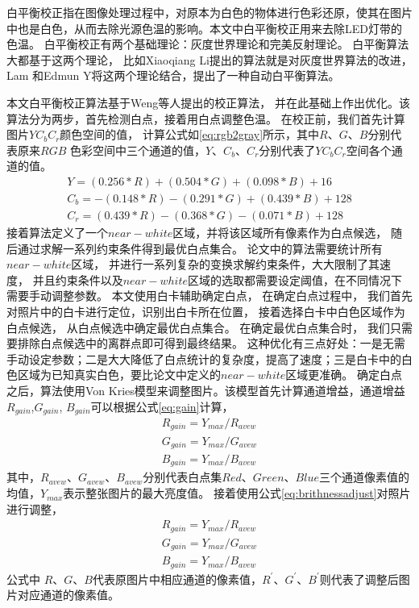 白平衡校正指在图像处理过程中，对原本为白色的物体进行色彩还原，使其在图片中也是白色，从而去除光源色温的影响。本文中白平衡校正用来去除LED灯带的色温。
白平衡校正有两个基础理论：灰度世界理论和完美反射理论。
白平衡算法大都基于这两个理论，
比如Xiaoqiang Li\cite{10.1007/978-3-642-37149-3_38}提出的算法就是对灰度世界算法的改进，
Lam 和Edmun Y\cite{lam2005combining}将这两个理论结合，提出了一种自动白平衡算法。
\par
本文白平衡校正算法基于Weng\cite{weng2005novel}等人提出的校正算法，
并在此基础上作出优化。该算法分为两步，首先检测白点，接着用白点调整色温。
在校正前，我们首先计算图片$YC_b C_r$颜色空间的值，
计算公式如\eqref{eq:rgb2gray}所示，其中$R$、$G$、$B$分别代表原来$RGB$
色彩空间中三个通道的值，$Y$、$C_b$、$C_r$分别代表了$YC_b C_r$空间各个通道的值。
\begin{equation}
\label{eq:rgb2gray}
\begin{split}
Y=(0.256\ast R)+ (0.504\ast G)+(0.098\ast B)+16\\
C_b=-(0.148\ast R)-(0.291\ast G)+(0.439\ast B)+128\\
C_r=(0.439\ast R)-(0.368\ast G)-(0.071\ast B)+128
\end{split}
\end{equation}
接着算法定义了一个$near-white$区域，并将该区域所有像素作为白点候选，
随后通过求解一系列约束条件得到最优白点集合。
论文中的算法需要统计所有$near-white$区域，
并进行一系列复杂的变换求解约束条件，大大限制了其速度，
并且约束条件以及$near-white$区域的选取都需要设定阈值，在不同情况下需要手动调整参数。
本文使用白卡辅助确定白点，
在确定白点过程中，
我们首先对照片中的白卡进行定位，识别出白卡所在位置，
接着选择白卡中白色区域作为白点候选，
从白点候选中确定最优白点集合。
在确定最优白点集合时，
我们只需要排除白点候选中的离群点即可得到最终结果。
这种优化有三点好处：一是无需手动设定参数；二是大大降低了白点统计的复杂度，提高了速度；三是白卡中的白色区域为已知真实白色，要比论文中定义的$near-white$区域更准确。
确定白点之后，算法使用Von Kries模型\cite{macadam1970sources}来调整图片。该模型首先计算通道增益，通道增益$R_{gain}$,$ G_{gain}$, $B_{gain}$可以根据公式\eqref{eq:gain}计算，
\begin{equation}
\label{eq:gain}
\begin{split}
R_{gain}=Y_{max}/R_{avew}\\
G_{gain}=Y_{max}/G_{avew}\\
B_{gain}=Y_{max}/B_{avew}
\end{split}
\end{equation}
其中，$R_{avew}$、$G_{avew}$、$B_{avew}$分别代表白点集$Red$、$Green$、$Blue$三个通道像素值的均值，$Y_{max}$表示整张图片的最大亮度值。
接着使用公式\eqref{eq:brithnessadjust}对照片进行调整，
\begin{equation}
\label{eq:brithnessadjust}
\begin{split}
R_{gain}=Y_{max}/R_{avew}\\
G_{gain}=Y_{max}/G_{avew}\\
B_{gain}=Y_{max}/B_{avew}
\end{split}
\end{equation}
公式中 $R$、$G$、$B$代表原图片中相应通道的像素值，$R^{'}$、$G^{'}$、$B^{'}$则代表了调整后图片对应通道的像素值。

